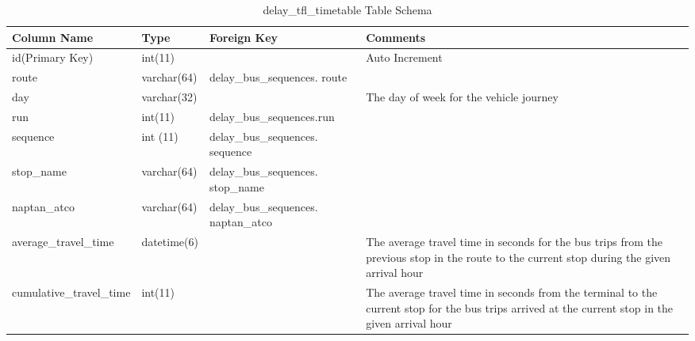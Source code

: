 \begin{appendices}
\begin{table}
\centering
\begin{tabular}{@{}llp{4cm}p{4cm}@{}} \toprule
Column Name & Type & Foreign Key & Comments\\ \midrule
id(Primary Key) & int(11) & & Auto Increment\\ [0.4cm]
route & varchar(64) & delay\_bus\_sequences. route \\ [0.4cm]
day & varchar(32) & & The day of week for the vehicle journey \\ [0.4cm]
run & int(11) & delay\_bus\_sequences.run \\ [0.4cm]
sequence & int (11) & delay\_bus\_sequences. sequence \\ [0.4cm]
stop\_name & varchar(64) & delay\_bus\_sequences. stop\_name \\ [0.4cm]
naptan\_atco & varchar(64) & delay\_bus\_sequences. naptan\_atco \\ [0.4cm]
average\_travel\_time & datetime(6) & & The average travel time in seconds for the bus trips from the previous stop in the route to the current stop during the given arrival hour \\ [0.4cm]
cumulative\_travel\_time & int(11) & & The average travel time in seconds from the terminal to the current stop for the bus trips arrived at the current stop in the given arrival hour \\
\bottomrule
\end{tabular}
\caption{delay\_tfl\_timetable Table Schema}
\label{table:delay_tfl_timetable}
\end{table}

\end{appendices}


